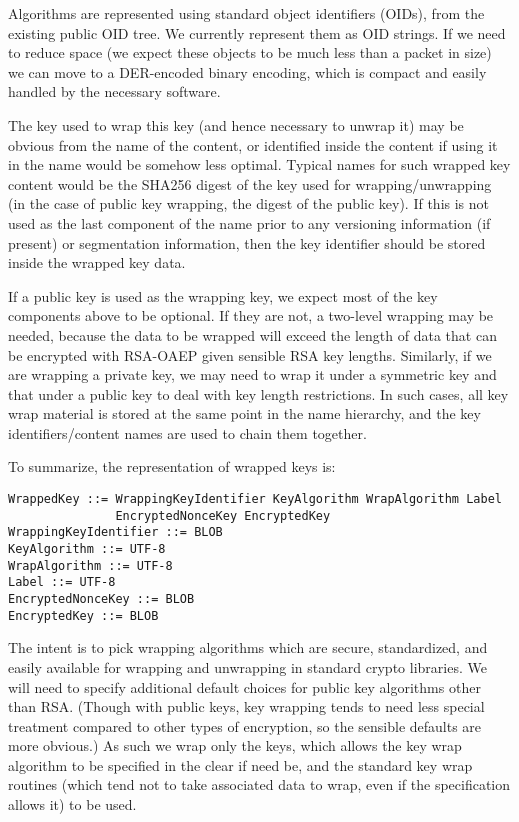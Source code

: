 Algorithms are represented using standard object identifiers (OIDs),
from the existing public OID tree. We currently represent them as OID
strings. If we need to reduce space (we expect these objects to be
much less than a packet in size) we can move to a DER-encoded binary
encoding, which is compact and easily handled by the necessary
software.

The key used to wrap this key (and hence necessary to unwrap it) may
be obvious from the name of the content, or identified inside the
content if using it in the name would be somehow less optimal. Typical
names for such wrapped key content would be the SHA256 digest of the
key used for wrapping/unwrapping (in the case of public key wrapping,
the digest of the public key). If this is not used as the last
component of the name prior to any versioning information (if present)
or segmentation information, then the key identifier should be stored
inside the wrapped key data.

If a public key is used as the wrapping key, we expect most of the key
components above to be optional. If they are not, a two-level wrapping
may be needed, because the data to be wrapped will exceed the length
of data that can be encrypted with RSA-OAEP given sensible RSA key
lengths. Similarly, if we are wrapping a private key, we may need to
wrap it under a symmetric key and that under a public key to deal with
key length restrictions. In such cases, all key wrap material is
stored at the same point in the name hierarchy, and the key
identifiers/content names are used to chain them together.

To summarize, the representation of wrapped keys is:
\begin{verbatim}
WrappedKey ::= WrappingKeyIdentifier KeyAlgorithm WrapAlgorithm Label 
               EncryptedNonceKey EncryptedKey 
WrappingKeyIdentifier ::= BLOB 
KeyAlgorithm ::= UTF-8 
WrapAlgorithm ::= UTF-8 
Label ::= UTF-8 
EncryptedNonceKey ::= BLOB 
EncryptedKey ::= BLOB 
\end{verbatim}

The intent is to pick wrapping algorithms which are secure,
standardized, and easily available for wrapping and unwrapping in
standard crypto libraries. We will need to specify additional default
choices for public key algorithms other than RSA. (Though with public
keys, key wrapping tends to need less special treatment compared to
other types of encryption, so the sensible defaults are more obvious.)
As such we wrap only the keys, which allows the key wrap algorithm to
be specified in the clear if need be, and the standard key wrap
routines (which tend not to take associated data to wrap, even if the
specification allows it) to be used.

